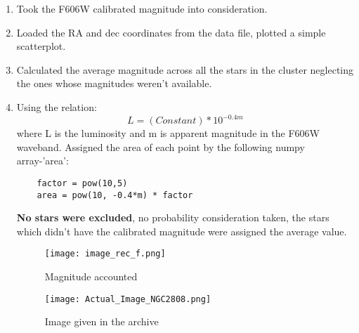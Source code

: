 \documentclass{article}
\begin{document}
\begin{enumerate}
    \item Took the F606W calibrated magnitude into consideration.
    \item   Loaded the RA and dec coordinates from the data file, plotted a simple scatterplot.
    \item Calculated the average magnitude across all the stars in the cluster neglecting the ones whose magnitudes weren't available.
    \item Using the relation: $$L = (Constant)*10^{-0.4m}$$
    where L is the luminosity and m is apparent magnitude in the F606W waveband.
    Assigned the area of each point by the following numpy array-'area':
    \begin{verbatim}
    factor = pow(10,5)
    area = pow(10, -0.4*m) * factor
    \end{verbatim}
    \textbf{No stars were excluded}, no probability consideration taken, the stars which didn't have the calibrated magnitude were assigned the average value.
    \begin{figure}[H]
    \caption{Magnitude accounted}
    \centering
    \texttt{[image: image\_rec\_f.png]}\newline
    \end{figure}
    \begin{figure}[H]
    \caption{Image given in the archive}
    \centering
    \texttt{[image: Actual\_Image\_NGC2808.png]}\newline
    \end{figure}
\end{enumerate}\newpage
\end{document}
